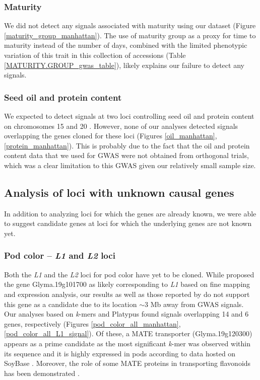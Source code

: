 \subsubsection*{Maturity}
\label{sv-gwas-main-results-maturity}

We did not detect any signals associated with maturity using our dataset
(Figure \ref{maturity_group_manhattan}). The use of maturity group as a proxy
for time to maturity instead of the number of days, combined with the limited
phenotypic variation of this trait in this collection of accessions (Table
\ref{MATURITY.GROUP_gwas_table}), likely explains our failure to detect
any signals.

\subsubsection*{Seed oil and protein content}
\label{sv-gwas-main-results-oil-protein}

We expected to detect signals at two loci controlling seed oil and protein
content on chromosomes 15 and 20 \citep{bandillo2015}. However, none of our
analyses detected signals overlapping the genes cloned for these loci (Figures
\ref{oil_manhattan}, \ref{protein_manhattan}). This is probably due to the fact
that the oil and protein content data that we used for GWAS were not obtained
from orthogonal trials, which was a clear limitation to this GWAS given our
relatively small sample size. 


\subsection*{Analysis of loci with unknown causal genes}
\label{sv-gwas-results}
In addition to analyzing loci for which the genes are already known, we were
able to suggest candidate genes at loci for which the underlying genes are not
known yet. 

\subsubsection*{Pod color -- \textit{L1} and \textit{L2} loci}
\label{sv-gwas-main-results-pod-color-l1-l2}

Both the \textit{L1} and the \textit{L2} loci for pod
color have yet to be cloned. While \cite{he2015} proposed the gene
Glyma.19g101700 as likely corresponding to \textit{L1} based on fine mapping
and expression analysis, our results as well as those reported by
\cite{bandillo2017} do not support this gene as a candidate due to its location
$\sim$3 Mb away from GWAS signals. Our analyses based on
\textit{k}-mers and Platypus found signals overlapping 14 and 6
genes, respectively (Figures \ref{pod_color_all_manhattan},
\ref{pod_color_all_L1_signal}). Of these, a MATE transporter (Glyma.19g120300)
appears as a prime candidate as the most significant \emph{k}-mer was observed
within its sequence and it is highly expressed in pods according to data hosted
on SoyBase \citep{grant2010, severin2010}. Moreover, the role of some MATE
proteins in transporting flavonoids has been demonstrated \citep{chen2015}.

